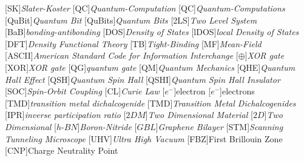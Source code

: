 \begin{acronym}[TDMA]
  [SK]{\emph{Slater-Koster}}
  [QC]{\emph{Quantum-Computation}}
  [QC]{\emph{Quantum-Computations}}
  [QuBit]{\emph{Quantum Bit}}
  [QuBits]{\emph{Quantum Bits}}
  [2LS]{\emph{Two Level System}}
  [BaB]{\emph{bonding-antibonding}}
  [DOS]{\emph{Density of States}}
  [lDOS]{\emph{local Density of States}}
  [DFT]{\emph{Density Functional Theory}}
  [TB]{\emph{Tight-Binding}}
  [MF]{\emph{Mean-Field}}
  [ASCII]{\emph{American Standard Code for Information Interchange}}
  [$\oplus$]{\emph{XOR gate}}
  [XOR]{\emph{XOR gate}}
  [QG]{\emph{quantum gate}}
  [QM]{\emph{Quantum Mechanics}}
  [QHE]{\emph{Quantum Hall Effect}}
  [QSH]{\emph{Quantum Spin Hall}}
  [QSHI]{\emph{Quantum Spin Hall Insulator}}
  [SOC]{\emph{Spin-Orbit Coupling}}
  [CL]{\emph{Curie Law}}
  [$e^{-}$]{electron}
  [$e^{-}$]{electrons}
  [TMD]{\emph{transition metal dichalcogenide}}
  [TMD]{\emph{Transition Metal Dichalcogenides}}
  [IPR]{\emph{inverse participation ratio}}
  [$2DM$]{\emph{Two Dimensional Material}}
  [$2D$]{\emph{Two Dimensional}}
  [$h$-$BN$]{\emph{Boron-Nitride}}
  [$GBL$]{\emph{Graphene Bilayer}}
  [STM]{\emph{Scanning Tunneling Microscope}}
  [UHV]{\emph{Ultra High Vacuum}}
  [FBZ]{First Brillouin Zone}
  [CNP]{Charge Neutrality Point}
\end{acronym}
